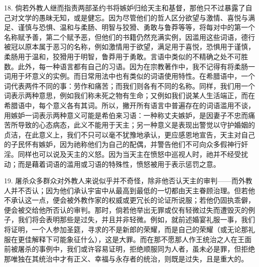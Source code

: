 18. 倘若外教人继而指责两部圣约书将嫉妒归给天主和基督，那他只不过暴露了自己对文学的愚昧无知，或是健忘。因为尽管他们的哲人区分欲望与激情、喜悦与满足、谨慎与恐惧、温和与柔肠、明智与狡猾、勇敢与鲁莽等等，将每对中的第一个名称赋予善，第二个赋予恶，但他们的书籍仍然充满实例，因滥用这些词语，德行被冠以原本属于恶习的名称，例如激情用于欲望，满足用于喜悦，恐惧用于谨慎，柔肠用于温和，狡猾用于明智，鲁莽用于勇敢。言语中类似的不精确之处不可胜数。此外，每一种语言都有自己的习语。因为在宗教著作中，我不记得有将柔肠一词用于坏意义的实例。而日常用法中也有类似的词语使用特性。在希腊语中，一个词代表两件不同的事：劳作和痛苦；而我们则各有不同的名称。同样，我们用一个词表示两种意思，例如我们称未死之物有生命；又例如我们说某人生活端正，而在希腊语中，每个意义各有其词。所以，撇开所有语言中普遍存在的词语滥用不谈，用嫉妒一词表示两种意义可能是希伯来习语：一种称丈夫嫉妒，是因妻子不忠而痛苦所导致的心态病态，此义不能用于天主；另一种意义是表现出警觉以守护婚姻的贞洁，在此意义上，我们不只可以毫不犹豫地承认，更应感恩地宣告，天主对自己的子民怀有嫉妒，因为祂称他们为自己的配偶，并警告他们不可向众多假神行奸淫。同样也可以说及天主的义怒。因为当天主在愤怒中巡视人时，祂并不经受扰动；而是藉着词语的滥用或习语的特殊性，愤怒被用于表示惩罚之意。\par

19. 屠杀众多群众对外教人来说似乎并不奇怪，除非他否认天主的审判——而外教人并不否认；因为他们承认宇宙中从最高到最低的一切都由天主眷顾治理。但若他不承认这一点，便会被外教作家的权威或更冗长的论证所说服；若他仍固执乖僻，便会被交给他所否认的审判。那时，倘若他举出无罪或仅有轻微过失而遭毁灭的例子，我们将会表明那些是过失，并且并非轻微。例如，就前述婚宴礼服一事，我们将证明，一个人参加圣筵，寻求的不是新郎的荣耀，而是自己的荣耀（或无论那礼服在更佳解释下可能象征什么），这是大罪。而在那不愿那人作王统治之人在王面前被屠杀的事例中，我们或许容易证明，拒绝顺服同为人者，虽未必是罪，但拒绝那唯独在其统治中才有正义、幸福与永存者的统治，则既是过失，且是重大的。\par


